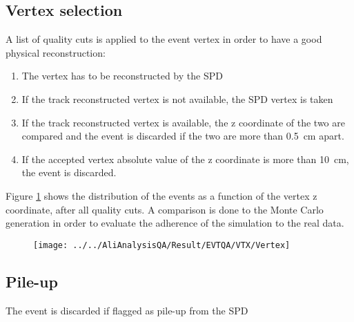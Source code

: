 \subsection{Vertex selection}
A list of quality cuts is applied to the event vertex in order to have a good physical reconstruction:
\begin{enumerate}
\item The vertex has to be reconstructed by the SPD
\item If the track reconstructed vertex is not available, the SPD vertex is taken
\item If the track reconstructed vertex is available, the z coordinate of the two are compared and the event is discarded if the two are more than \SI{0.5}{\centi\meter} apart.
\item If the accepted vertex absolute value of the z coordinate is more than \SI{10}{\centi\meter}, the event is discarded.
\end{enumerate}
Figure \ref{fig:vertex} shows the distribution of the events as a function of the vertex z coordinate, after all quality cuts. A comparison is done to the Monte Carlo generation in order to evaluate the adherence of the simulation to the real data.

\begin{figure}[!h]
\texttt{[image: ../../AliAnalysisQA/Result/EVTQA/VTX/Vertex]}
\label{fig:vertex}
\caption{}
\end{figure}

\subsection{Pile-up}
The event is discarded if flagged as pile-up from the SPD

